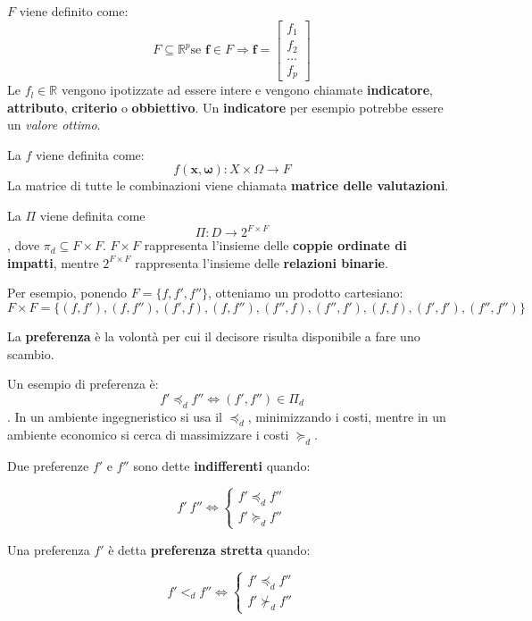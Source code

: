 \documentclass[\main/main.tex]{subfiles}
\begin{document}
$F$ viene definito come: \[F \subseteq \mathbb{R}^p \text{se } \bm{f} \in F \Rightarrow \bm{f} = \begin{bmatrix}f_1\\ f_2\\...\\ f_p \end{bmatrix}\]
Le $f_l \in \mathbb{R}$ vengono ipotizzate ad essere intere e vengono chiamate \textbf{indicatore}, \textbf{attributo}, \textbf{criterio} o \textbf{obbiettivo}. Un \textbf{indicatore} per esempio potrebbe essere un \textit{valore ottimo}.

La $f$ viene definita come: \[ f(\bm{x},\bm{\omega}): X\times\Omega \rightarrow F \]
La matrice di tutte le combinazioni viene chiamata \textbf{matrice delle valutazioni}.

La $\Pi$ viene definita come \[\Pi: D \rightarrow 2^{F\times F}\], dove $\pi_d \subseteq F\times F$. $F\times F$ rappresenta l'insieme delle \textbf{coppie ordinate di impatti}, mentre $2^{F \times F}$ rappresenta l'insieme delle \textbf{relazioni binarie}.

Per esempio, ponendo $F = \{f, f', f''\}$, otteniamo un prodotto cartesiano: \[F \times F = \{ (f,f'), (f,f''), (f', f), (f, f''), (f'', f), (f'', f'), (f, f), (f', f'), (f'', f'') \}\]

La \textbf{preferenza} è la volontà per cui il decisore risulta disponibile a fare uno scambio.

Un esempio di preferenza è: \[ f' \preccurlyeq_d f'' \Leftrightarrow (f', f'')\in \Pi_d \]. In un ambiente ingegneristico si usa il $\preccurlyeq_d$, minimizzando i costi, mentre in un ambiente economico si cerca di massimizzare i costi $\succcurlyeq_d$.

\begin{definition}[indifferenza]
	Due preferenze $f'$ e $f''$ sono dette \textbf{indifferenti} quando:

	\[
		f' ~ f'' \Leftrightarrow \begin{cases} f' \preccurlyeq_d f'' \\ f' \succcurlyeq_d f'' \end{cases}
	\]
\end{definition}

\begin{definition}
	Una preferenza $f'$ è detta \textbf{preferenza stretta} quando:

	\[
		f' <_d f'' \Leftrightarrow
		\begin{cases}
			f' \preccurlyeq_d f'' \\
			f' \nsucc_d f''
		\end{cases}
	\]
\end{definition}
\end{document}
